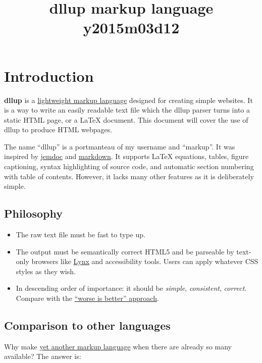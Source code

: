 \title{dllup markup language\\y2015m03d12}
\maketitle
\section{Introduction}
\label{s1}
\textbf{dllup} is a \href{https://en.wikipedia.org/wiki/Lightweight_markup_language}{lightweight markup language} designed for creating simple websites. It is a way to write an easily readable text file which the dllup parser turns into a static HTML page, or a LaTeX document. This document will cover the use of dllup to produce HTML webpages.

The name ``dllup'' is a portmanteau of my username and ``markup''. It was inspired by \href{http://jemdoc.jaboc.net/}{jemdoc} and \href{http://daringfireball.net/projects/markdown/}{markdown}. It supports LaTeX equations, tables, figure captioning,  syntax highlighting of source code, and automatic section numbering with table of contents. However, it lacks many other features as it is deliberately simple.

\subsection{Philosophy}
\label{s1.1}
\begin{itemize}\item The raw text file must be fast to type up.
\item The output must be semantically correct HTML5 and be parseable by text-only browsers like \href{https://en.wikipedia.org/wiki/Lynx_%28web_browser%29}{Lynx} and accessibility tools. Users can apply whatever CSS styles as they wish.
\item In descending order of importance: it should be \emph{simple}, \emph{consistent}, \emph{correct}. Compare with the \href{http://en.wikipedia.org/wiki/Worse_is_better}{``worse is better'' approach}.
\end{itemize}
\subsection{Comparison to other languages}
\label{s1.2}
Why make \href{http://xkcd.com/927/}{yet another markup language} when there are already so many available? The answer is:

